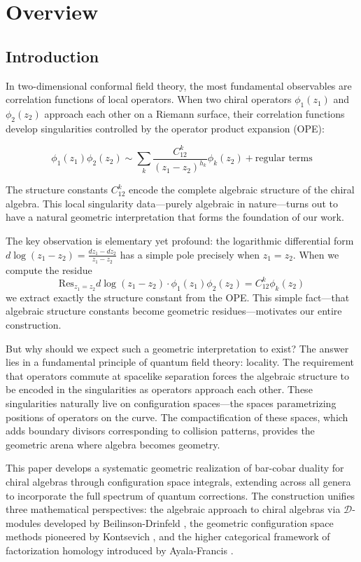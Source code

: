 \chapter{Overview}

\section{Introduction}

In two-dimensional conformal field theory, the most fundamental observables are correlation functions of local operators. When two chiral operators $\phi_1(z_1)$ and $\phi_2(z_2)$ approach each other on a Riemann surface, their correlation functions develop singularities controlled by the operator product expansion (OPE):

$$\phi_1(z_1) \phi_2(z_2) \sim \sum_k \frac{C^k_{12}}{(z_1 - z_2)^{h_k}} \phi_k(z_2) + \text{regular terms}$$

The structure constants $C^k_{12}$ encode the complete algebraic structure of the chiral algebra. This local singularity data—purely algebraic in nature—turns out to have a natural geometric interpretation that forms the foundation of our work.

The key observation is elementary yet profound: the logarithmic differential form $d\log(z_1 - z_2) = \frac{dz_1 - dz_2}{z_1 - z_2}$ has a simple pole precisely when $z_1 = z_2$. When we compute the residue
$$\text{Res}_{z_1=z_2} d\log(z_1 - z_2) \cdot \phi_1(z_1)\phi_2(z_2) = C^k_{12} \phi_k(z_2)$$
we extract exactly the structure constant from the OPE. This simple fact—that algebraic structure constants become geometric residues—motivates our entire construction.

But why should we expect such a geometric interpretation to exist? The answer lies in a fundamental principle of quantum field theory: locality. The requirement that operators commute at spacelike separation forces the algebraic structure to be encoded in the singularities as operators approach each other. These singularities naturally live on configuration spaces—the spaces parametrizing positions of operators on the curve. The compactification of these spaces, which adds boundary divisors corresponding to collision patterns, provides the geometric arena where algebra becomes geometry.

This paper develops a systematic geometric realization of bar-cobar duality for chiral algebras through configuration space integrals, extending across all genera to incorporate the full spectrum of quantum corrections. The construction unifies three mathematical perspectives: the algebraic approach to chiral algebras via $\mathcal{D}$-modules developed by Beilinson-Drinfeld \cite{BD04}, the geometric configuration space methods pioneered by Kontsevich \cite{Kon94, Kon99}, and the higher categorical framework of factorization homology introduced by Ayala-Francis \cite{AF15}.

